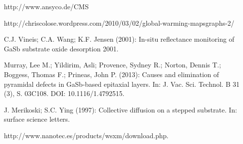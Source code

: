 \documentclass[paper=a4,fontsize=10pt,DIV=18,twocolumn,parskip=half]{scrartcl}
\numberwithin{equation}{section}    %
\begin{document}
\begin{thebibliography}{}   

 http://www.ansyco.de/CMS

 http://chriscolose.wordpress.com/2010/03/02/global-warming-mapsgraphs-2/

 C.J. Vineis; C.A. Wang; K.F. Jensen (2001): In-situ reflectance 
monitoring of GaSb substrate oxide desorption 2001.

 Murray, Lee M.; Yildirim, Asli; Provence, Sydney R.; Norton, 
Dennis T.; Boggess, Thomas F.; Prineas, John P. (2013): Causes and elimination 
of pyramidal defects in GaSb-based epitaxial layers. In: J. Vac. Sci. Technol. B 
31 (3), S. 03C108. DOI: 10.1116/1.4792515.
  
 J. Merikoski; S.C. Ying (1997): Collective diffusion on a stepped substrate. In: surface science letters.

 http://www.nanotec.es/products/wsxm/download.php. 
\end{thebibliography}
\end{document}
